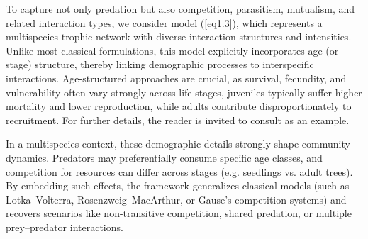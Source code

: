 \documentclass[10pt, a4paper]{amsart}
\theoremstyle{plain}
\theoremstyle{definition}
\theoremstyle{remark}
\numberwithin{equation}{section}
\begin{document}
To capture not only predation but also competition, parasitism, mutualism, and related interaction types, we consider model (\ref{eq1.3}), which represents a multispecies trophic network with diverse interaction structures and intensities. Unlike most classical formulations, this model explicitly incorporates age (or stage) structure, thereby linking demographic processes to interspecific interactions. Age-structured approaches are crucial, as survival, fecundity, and vulnerability often vary strongly across life stages, juveniles typically suffer higher mortality and lower reproduction, while adults contribute disproportionately to recruitment. For further details, the reader is invited to consult \cite{ref79} as an example.

In a multispecies context, these demographic details strongly shape community dynamics. Predators may preferentially consume specific age classes, and competition for resources can differ across stages (e.g. seedlings vs. adult trees). By embedding such effects, the framework generalizes classical models (such as Lotka–Volterra, Rosenzweig–MacArthur, or Gause’s competition systems) and recovers scenarios like non-transitive competition, shared predation, or multiple prey–predator interactions.
\end{document}
